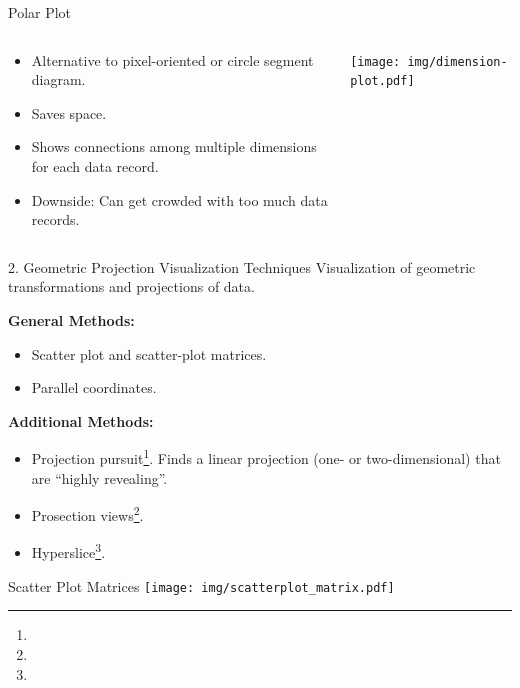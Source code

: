 \begin{frame}{Polar Plot}
	\begin{columns}[t]
		\begin{column}{0.5\textwidth}
			\begin{itemize}
				\item Alternative to pixel-oriented or circle segment diagram.
				\item Saves space.
				\item Shows connections among multiple dimensions for each data record.
				\item Downside: Can get crowded with too much data records.
			\end{itemize}
		\end{column}
		\begin{column}{0.5\textwidth}
			\vspace{-5em}
			\begin{center}
				\texttt{[image: img/dimension-plot.pdf]}
			\end{center}
		\end{column}
	\end{columns}
\end{frame}

\begin{frame}{2. Geometric Projection Visualization Techniques}
	Visualization of geometric transformations and projections of data.

	\textbf{General Methods:}
	\begin{itemize}
		\item Scatter plot and scatter-plot matrices.
		\item Parallel coordinates.
	\end{itemize}

	\textbf{Additional Methods:}
	\begin{itemize}
		\item Projection pursuit\footnote{}.
		      Finds a linear projection (one- or two-dimensional) that are ``highly revealing''.
		\item Prosection views\footnote{}.
		\item Hyperslice\footnote{}.
	\end{itemize}
\end{frame}

\begin{frame}{Scatter Plot Matrices}
	\centering
	\texttt{[image: img/scatterplot\_matrix.pdf]}
\end{frame}

